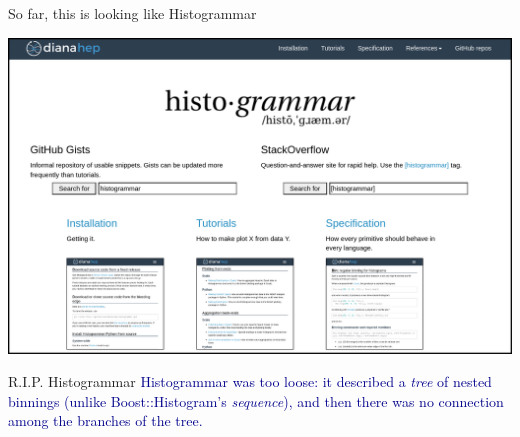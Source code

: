 \documentclass[aspectratio=169]{beamer}
\begin{document}
\begin{frame}{So far, this is looking like Histogrammar}
\vspace{0.08 cm}
\begin{center}
\includegraphics[width=0.9\linewidth]{histogrammar-website.png}
\end{center}
\end{frame}

\begin{frame}{R.I.P. Histogrammar}
\vspace{0.5 cm}
\Large
\textcolor{darkblue}{Histogrammar was too loose: it described a {\it tree} of nested binnings (unlike Boost::Histogram's {\it sequence}), and then there was no connection among the branches of the tree.}

\vspace{1 cm}
\end{frame}
\end{document}
